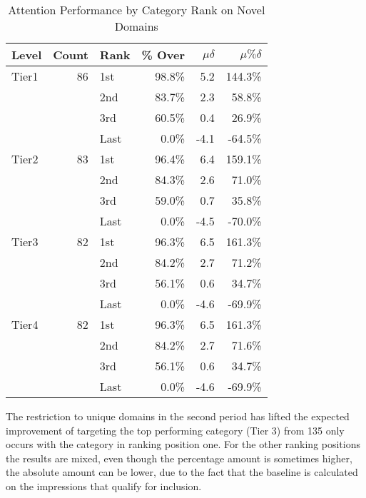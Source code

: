 \documentclass[sigconf]{acmart}
\begin{document}
\begin{table}
\caption{Attention Performance by Category Rank on Novel Domains}
\label{tab:nodomainrepeats}
\begin{tabular}{|l|r|l|r|r|r|}
\toprule
Level   &Count  &Rank &\% Over  &$\mu\delta$  &$\mu\%\delta$        \\
\midrule
Tier1   &86       &1st  &98.8\%     &5.2         &144.3\%     \\
        &         &2nd  &83.7\%     &2.3         &58.8\%     \\
        &         &3rd  &60.5\%     &0.4         &26.9\%     \\
        &         &Last &0.0\%      &-4.1        &-64.5\%     \\
Tier2   &83       &1st  &96.4\%     &6.4         &159.1\%     \\
        &         &2nd  &84.3\%     &2.6         &71.0\%     \\
        &         &3rd  &59.0\%     &0.7         &35.8\%     \\
        &         &Last &0.0\%      &-4.5        &-70.0\%     \\
Tier3   &82       &1st  &96.3\%     &6.5         &161.3\%     \\
        &         &2nd  &84.2\%     &2.7         &71.2\%     \\
        &         &3rd  &56.1\%     &0.6         &34.7\%     \\
        &         &Last &0.0\%      &-4.6        &-69.9\%     \\
Tier4   &82       &1st  &96.3\%     &6.5         &161.3\%     \\
        &         &2nd  &84.2\%     &2.7         &71.6\%     \\
        &         &3rd  &56.1\%     &0.6         &34.7\%     \\
        &         &Last &0.0\%      &-4.6        &-69.9\%     \\
\bottomrule
\end{tabular}
\end{table}


The restriction to unique domains in the second period has lifted the expected improvement
of targeting the top performing category (Tier 3) from 135%
only occurs with the category in ranking position one. For the other ranking positions
the results are mixed, even though the percentage amount is sometimes higher, the
absolute amount can be lower, due to the fact that the baseline is calculated on
the impressions that qualify for inclusion.
\end{document}
